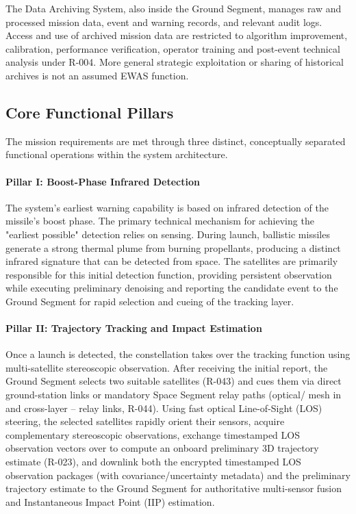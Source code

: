The Data Archiving System, also inside the Ground Segment, manages raw and processed mission data, event and warning records, and relevant audit logs. Access and use of archived mission data are restricted to algorithm improvement, calibration, performance verification, operator training and post-event technical analysis under R-004. More general strategic exploitation or sharing of historical archives is not an assumed EWAS function.

\subsection{Core Functional Pillars}  
The mission requirements are met through three distinct, conceptually separated functional operations within the system architecture. 

\paragraph{Pillar I: Boost-Phase Infrared Detection}
The system's earliest warning capability is based on infrared detection of the missile's boost phase. The primary technical mechanism for achieving the "earliest possible" detection relies on  sensing. During launch, ballistic missiles generate a strong thermal plume from burning propellants, producing a distinct infrared signature that can be detected from space. The  satellites are primarily responsible for this initial detection function, providing persistent observation while executing preliminary denoising and reporting the candidate event to the Ground Segment for rapid selection and cueing of the tracking layer. 

\paragraph{Pillar II: Trajectory Tracking and Impact Estimation}
Once a launch is detected, the  constellation takes over the tracking function using multi-satellite stereoscopic observation. After receiving the initial  report, the Ground Segment selects two suitable  satellites (R-043) and cues them via direct ground-station links or mandatory Space Segment  relay paths (optical/  mesh in  and cross-layer -- relay links, R-044). Using fast optical Line-of-Sight (LOS) steering, the selected  satellites rapidly orient their sensors, acquire complementary stereoscopic observations, exchange timestamped LOS observation vectors over  to compute an onboard preliminary 3D trajectory estimate (R-023), and downlink both the encrypted timestamped LOS observation packages (with covariance/uncertainty metadata) and the preliminary trajectory estimate to the Ground Segment for authoritative multi-sensor fusion and Instantaneous Impact Point (IIP) estimation.  

